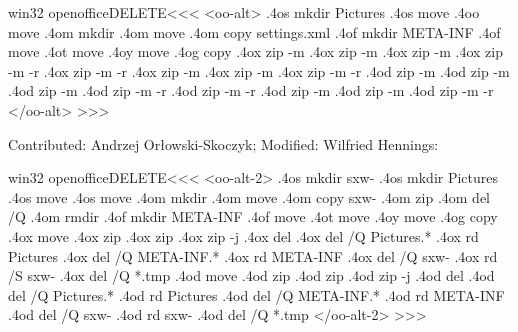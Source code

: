 \documentclass{article}
\begin{document}
\<win32 openofficeDELETE\><<<
%
%
<oo-alt>
.4os mkdir Pictures
.4os move  %
.4oo move  %
%
.4om mkdir %
.4om move  %
.4om copy  settings.xml %
%
.4of mkdir META-INF
.4of move  %
%
.4ot move  %
.4oy move  %
.4og copy  %
.4ox zip -m %
.4ox zip -m %
.4ox zip -m %
.4ox zip -m -r %
.4ox zip -m -r %
.4ox zip -m %
.4ox zip -m %
.4ox zip -m -r %
.4od zip -m %
.4od zip -m %
.4od zip -m %
.4od zip -m -r %
.4od zip -m -r %
.4od zip -m %
.4od zip -m %
.4od zip -m -r %
</oo-alt>
>>>







Contributed: Andrzej Or\l{}owski-Skoczyk; Modified: Wilfried Hennings:

\<win32 openofficeDELETE\><<<
<oo-alt-2>
.4os mkdir sxw-%
.4os mkdir Pictures
.4os move  %
.4os move  %
%
.4om mkdir %
.4om move  %
.4om copy  sxw-%
.4om zip  %
.4om del /Q %
.4om rmdir %
%
.4of mkdir META-INF
.4of move  %
%
.4ot move  %
.4oy move  %
.4og copy  %
.4ox move %
.4ox zip   %
.4ox zip   %
.4ox zip -j %
%
.4ox del %
.4ox del /Q Pictures\*.*
.4ox rd Pictures
.4ox del /Q META-INF\*.*
.4ox rd META-INF
.4ox del /Q sxw-%
.4ox rd /S sxw-%
.4ox del /Q *.tmp
.4od move %
.4od zip %
.4od zip %
.4od zip -j %
%
.4od del %
.4od del /Q Pictures\*.*
.4od rd Pictures
.4od del /Q META-INF\*.*
.4od rd META-INF
.4od del /Q sxw-%
.4od rd sxw-%
.4od del /Q *.tmp
</oo-alt-2>
>>>
\end{document}
